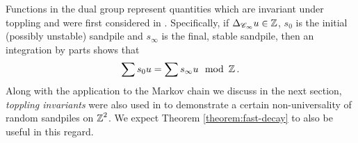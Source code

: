 \documentclass[12pt]{amsart}
\numberwithin{equation}{section}
\begin{document}
	
	Functions in the dual group represent quantities which are invariant under toppling and were first considered in \cite{dhar-algebraic-aspects}.
	Specifically, if $\Delta_{\mathscr{C}_{\infty}} u \in \operatorname{\mathbb{Z}}$, $s_0$ is the initial (possibly unstable) sandpile
	and $s_{\infty}$ is the final, stable sandpile, then an integration by parts shows that
	\begin{equation} \label{eq:toppling-invariant}
		\sum s_0 u = \sum s_{\infty} u \mod {\operatorname{\mathbb{Z}}}.
	\end{equation}
	Along with the application to the Markov chain we discuss in the next section, {\it toppling invariants} were also used in \cite[Theorem 1]{sandpiles-square-lattice} to demonstrate a certain non-universality
	of random sandpiles on $\operatorname{\mathbb{Z}}^2$.  We expect Theorem \ref{theorem:fast-decay} to also be useful in this regard. 
	
	
	
	
	
\end{document}
